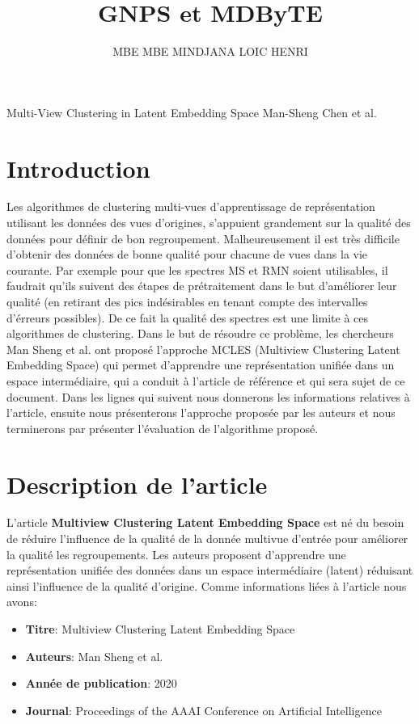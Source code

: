 \documentclass[12pt, french, latin.medieval, a4paper]{report}
\author{MBE MBE MINDJANA LOIC HENRI}
\title{GNPS et MDByTE}
\begin{document}
    
    \pagecouverture
    {Multi-View Clustering in Latent Embedding Space}
    {Man-Sheng Chen et al.}
    \tableofcontents
    \vspace{20cm}
    
    \section{Introduction}
	Les algorithmes de clustering multi-vues d'apprentissage de représentation utilisant les données des vues d'origines, s'appuient grandement sur la qualité des données pour définir de bon regroupement. Malheureusement il est très difficile d'obtenir des données de bonne qualité pour chacune de vues dans la vie courante. Par exemple pour que les spectres MS et RMN soient utilisables, il faudrait qu'ils suivent des étapes de prétraitement dans le but d'améliorer leur qualité (en retirant des pics indésirables en tenant compte des intervalles d'érreurs possibles). De ce fait la qualité des spectres est une limite à ces algorithmes de clustering. Dans le but de résoudre ce problème, les chercheurs Man Sheng et al. ont proposé l'approche MCLES (Multiview Clustering Latent Embedding Space) qui permet d'apprendre une représentation unifiée dans un espace intermédiaire, qui a conduit à l'article de référence \cite{mcles} et qui sera sujet de ce document. Dans les lignes qui suivent nous donnerons les informations relatives à l'article, ensuite nous présenterons l'approche proposée par les auteurs et nous terminerons par présenter l'évaluation de l'algorithme proposé.
    
	\section{Description de l'article}
     	L'article \textbf{Multiview Clustering Latent Embedding Space} \cite{mcles} est né du besoin de réduire l'influence de la qualité de la donnée multivue d'entrée pour améliorer la qualité les regroupements. Les auteurs proposent d'apprendre une représentation unifiée des données dans un espace intermédiaire (latent) réduisant ainsi l'influence de la qualité d'origine. Comme informations liées à l'article nous avons:
    	 
    	\begin{itemize}
        	\item \textbf{Titre}: Multiview Clustering Latent Embedding Space
        	\item \textbf{Auteurs}: Man Sheng et al.
        	\item \textbf{Année de publication}: 2020
        	\item \textbf{Journal}: Proceedings of the AAAI Conference on Artificial Intelligence
    	\end{itemize}
\end{document}

